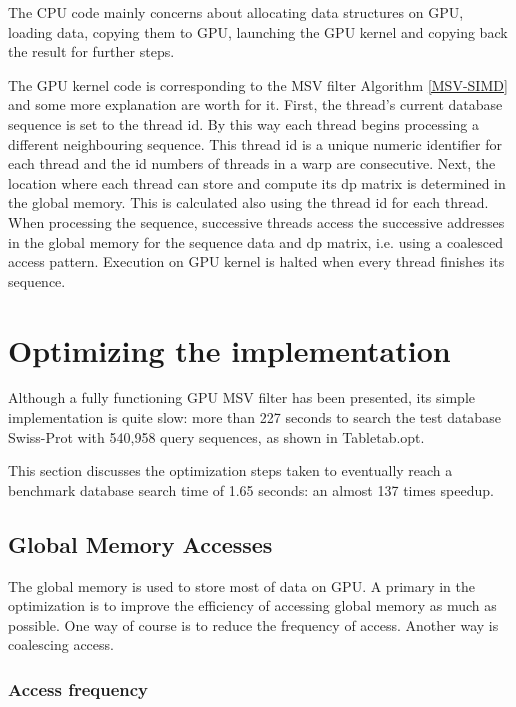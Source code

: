 The CPU code mainly concerns about allocating data structures on GPU, loading data, copying them to GPU, launching the GPU kernel and copying back the result for further steps.

The GPU kernel code is corresponding to the MSV filter Algorithm \ref{MSV-SIMD} and some more explanation are worth for it. First, the thread's current database sequence is set to the thread id. By this way each thread begins processing a different neighbouring sequence. This thread id is a unique numeric identifier for each thread and the id numbers of threads in a warp are consecutive. Next, the location where each thread can store and compute its dp matrix is determined in the global memory. This is calculated also using the thread id for each thread. When processing the sequence, successive threads access the successive addresses in the global memory for the sequence data and dp matrix, i.e. using a coalesced access pattern. Execution on GPU kernel is halted when every thread finishes its sequence.


\section{Optimizing the implementation}

Although a fully functioning GPU MSV filter has been presented, its simple implementation is quite slow: more than 227 seconds to search the test database Swiss-Prot with 540,958 query sequences, as shown in Table{tab.opt}.

This section discusses the optimization steps taken to eventually reach a benchmark database search time of 1.65 seconds: an almost 137 times speedup.

\subsection{Global Memory Accesses}
\label{global}

The global memory is used to store most of data on GPU. A primary in the optimization is to improve the efficiency of accessing global memory as much as possible. One way of course is to reduce the frequency of access. Another way is coalescing access.

\subsubsection*{Access frequency}

